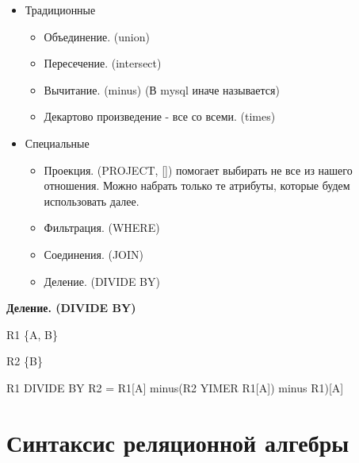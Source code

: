 \begin{itemize}
	\item Традиционные
	      \begin{itemize}
		      \item Объединение. (union)
		      \item Пересечение. (intersect)
		      \item Вычитание. (minus) (В mysql иначе называется)
		      \item Декартово произведение - все со всеми.  (times)
	      \end{itemize}
	\item Специальные
	      \begin{itemize}
		      \item Проекция. (PROJECT, []) помогает выбирать не все из нашего отношения.
		            Можно набрать только те атрибуты, которые будем использовать далее.
		      \item Фильтрация. (WHERE)
		      \item Соединения. (JOIN)
		      \item Деление. (DIVIDE BY)
	      \end{itemize}
\end{itemize}



\textbf{Деление. (DIVIDE BY)}

R1 \{A, B\}

R2 \{B\}

R1 DIVIDE BY R2 = R1[A] minus(R2 YIMER R1[A]) minus R1)[A]

\section{Синтаксис реляционной алгебры}


